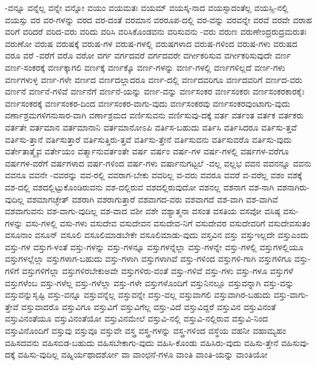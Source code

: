 {-ವನ್ನೂ
ವನ್ನೆಲ್ಲ
ವನ್ನೇ
ವನ್ನೋ
ವಯಂ
ವಯಮತಃ
ವಯಮ್
ವಯಸ್ಕ-ನಾದ
ವಯಸ್ಸಾದಂತೆಲ್ಲ
ವಯಸ್ಸಿ-ನಲ್ಲಿ
ವಯಸ್ಸು
ವರ
ವರ-ಗಳನ್ನು
ವರದ
ವರ-ದಂತೆ
ವರಮಾನ
ವರರೂಪ-ದಲ್ಲಿ
ವರ-ವನ್ನು
ವರವನ್ನೇ
ವರವೆ
ವರವೇ
ವರಾಹ
ವರಿಗೆ
ವರಿದರೆ
ವರಿದ-ವರು
ವರಿದು
ವರಿಸಿ
ವರಿಸಿಕೊಂಡವನು
ವರಿಸುವನು
-ವರು
ವರುಣ
ವರುಣೇಂದ್ರರುದ್ರಮರುತಃ
ವರುಣೋ
ವರುಷ
ವರುಷಕ್ಕೆ
ವರುಷ-ಗಳ
ವರುಷ-ಗಳಲ್ಲಿ
ವರುಷಗಳಾದ
ವರುಷ-ಗಳಿಂದ
ವರುಷ-ಗಳು
ವರುಷದ
ವರೂ
ವರೆ
-ವರೆಗೆ
ವರೊ
ವರೋ
ವರ್ಗ
ವರ್ಗದವರೆ
ವರ್ಗದವರೇ
ವರ್ಗೀಕರಿಸುವ
ವರ್ಗೀಕರಿಸುವುದೇ
ವರ್ಣ
ವರ್ಣ-ಸಂಕರಕ್ಕೆ
ವರ್ಣಕ್ಕಾಗಲಿ
ವರ್ಣಕ್ಕೆ
ವರ್ಣಕ್ಕೊ
ವರ್ಣ-ಗಳನ್ನು
ವರ್ಣ-ಗಳಲ್ಲಿ
ವರ್ಣಗಳಿಲ್ಲದೆ
ವರ್ಣ-ಗಳು
ವರ್ಣಗಳುಳ್ಳ
ವರ್ಣ-ಗಳೇ
ವರ್ಣದ
ವರ್ಣದಲ್ಲಾದರೂ
ವರ್ಣ-ದಲ್ಲಿ
ವರ್ಣದವರಿಗೂ
ವರ್ಣದವರಿಗೆ
ವರ್ಣದ-ವರು
ವರ್ಣನೆ
ವರ್ಣನೆ-ಗಳಿವೆ
ವರ್ಣನೆಗೆ
ವರ್ಣನೆ-ಯನ್ನು
ವರ್ಣ-ವನ್ನು
ವರ್ಣಸಂಕರ
ವರ್ಣಸಂಕರಃ
ವರ್ಣಸಂಕರಕಾರಕೈಃ
ವರ್ಣಸಂಕರಕ್ಕೆ
ವರ್ಣಸಂಕರ-ದಿಂದ
ವರ್ಣಸಂಕರ-ವಾಗು-ವುದು
ವರ್ಣಸಂಕರವು
ವರ್ಣಸಂಕರವುಂಟಾಗು-ವುದು
ವರ್ಣಾಶ್ರಮಗಳಿಗನುಸಾರ-ವಾಗಿ
ವರ್ಣಾಶ್ರಮದ
ವರ್ಣಿಸುವನು
ವರ್ಣಿಸುವು-ದಕ್ಕೆ
ವರ್ತ
ವರ್ತಂತ
ವರ್ತಕ
ವರ್ತಕರು
ವರ್ತತೇ
ವರ್ತಮಾನ
ವರ್ತಮಾನಾನಿ
ವರ್ತಮಾನೋಽಪಿ
ವರ್ತಿಸ-ಬಹುದು
ವರ್ತಿಸಿ
ವರ್ತಿಸಿದರೂ
ವರ್ತಿಸು-ತ್ತವೆ
ವರ್ತಿಸು-ತ್ತಾನೆ
ವರ್ತಿಸುತ್ತಾರೆ
ವರ್ತಿಸುತ್ತಿರು-ತ್ತವೆ
ವರ್ತಿಸು-ತ್ತೇನೆ
ವರ್ತಿಸುವನು
ವರ್ತಿಸುವರೊ
ವರ್ತಿಸು-ವುದು
ವರ್ತೇತಾತ್ಮೈವ
ವರ್ತೇಯಂ
ವರ್ತ್ಮಾನುವರ್ತಂತೇ
ವರ್ಷ
ವರ್ಷಂ
ವರ್ಷ-ಗಳ
ವರ್ಷ-ಗಳಲ್ಲಿ
ವರ್ಷಗಳ-ವರೆಗೂ
ವರ್ಷಗಳ-ವರೆಗೆ
ವರ್ಷಗಳಾದ
ವರ್ಷ-ಗಳಿಂದ
ವರ್ಷ-ಗಳು
ವರ್ಷಾನುಗಟ್ಟಲೆ
-ವಲ್ಲ
ವಲ್ಲಭ
ವವನ
ವವನನ್ನೂ
ವವನು
ವವನೂ
ವವನೇ
-ವವರನ್ನು
ವವ-ರಲ್ಲಿ
ವವರಾಗ-ಬೇಕು
ವವರಿಲ್ಲ
ವ-ವರು
ವವರೂ
ವವರೆ
ವ-ವರೆಲ್ಲ
ವಶಂ
ವಶಕ್ಕೆ
ವಶ-ದಲ್ಲಿ
ವಶದಲ್ಲಿಟ್ಟುಕೊಂಡಿರುವನು
ವಶ-ದಲ್ಲಿರುವ
ವಶದಲ್ಲಿರುವುದೋ
ವಶನಲ್ಲ
ವಶನಾಗ
ವಶ-ನಾಗಿ
ವಶನಾಗಿರು-ವುದಿಲ್ಲ
ವಶಮಾಗಚ್ಛೇತ್
ವಶರಾಗಿ
ವಶರಾಗುತ್ತಾರೆ
ವಶವಾಗದ-ವರು
ವಶವಾಗದೆ
ವಶ-ವಾಗಿ
ವಶ-ವಾಗಿವೆ
ವಶವಾಗುವನು
ವಶ-ವಾಗು-ವುದಿಲ್ಲ
ವಶ-ವಾದ
ವಶೀ
ವಶೇ
ವಶ್ಯಾತ್ಮನಾ
ವಸಂತ
ವಸತಿಯ
ವಸವೋ
ವಸಿಷ್ಠ
ವಸು-ಗಳನ್ನು
ವಸು-ಗಳಲ್ಲಿ
ವಸು-ಗಳು
ವಸುದೇವ
ವಸುದೇವನ
ವಸುದೇವ-ನಿಗೆ
ವಸುದೇವರ
ವಸುದೇವರಿಗೆ
ವಸುದೇವಸುತಂ
ವಸೂನಾಂ
ವಸೂನ್
ವಸೂಲಿ
ವಸೂಲಿಮಾಡಬೇಕೇ
ವಸೂಲಿಮಾಡು-ವುದು
ವಸ್ತವಿನ
ವಸ್ತು
ವಸ್ತುಇಲ್ಲದೇ
ವಸ್ತುಎಂದು
ವಸ್ತು-ಗಳ
ವಸ್ತುಗ-ಳಂತೆ
ವಸ್ತು-ಗಳನ್ನು
ವಸ್ತು-ಗಳನ್ನೂ
ವಸ್ತುಗಳನ್ನೆಲ್ಲಾ
ವಸ್ತು-ಗಳನ್ನೇ
ವಸ್ತು-ಗಳಲ್ಲಿ
ವಸ್ತುಗಳಲ್ಲಿಯೂ
ವಸ್ತುಗಳಲ್ಲೆಲ್ಲಾ
ವಸ್ತುಗಳಾಗ-ಬಹುದು
ವಸ್ತು-ಗಳಾಗಿ
ವಸ್ತುಗಳಾಗಿವೆ
ವಸ್ತು-ಗಳಿಂದ
ವಸ್ತುಗಳಿ-ಗಾಗಿ
ವಸ್ತುಗಳಿಗೂ
ವಸ್ತು-ಗಳಿಗೆ
ವಸ್ತುಗಳಿಗೆಲ್ಲಾ
ವಸ್ತುಗಳಿರಬೇಕುಅವೇ
ವಸ್ತುಗಳಿರು-ವಂತೆ
ವಸ್ತು-ಗಳಿವೆ
ವಸ್ತು-ಗಳು
ವಸ್ತು-ಗಳೂ
ವಸ್ತುಗಳೆ
ವಸ್ತುಗಳೆಂಬ
ವಸ್ತು-ಗಳೆಲ್ಲ
ವಸ್ತು-ಗಳೆಲ್ಲಾ
ವಸ್ತು-ಗಳೇ
ವಸ್ತುಗಳೊಂದಿಗೆ
ವಸ್ತುನಿನಲ್ಲೂ
ವಸ್ತುವನ್ನಾಗಿ
ವಸ್ತು-ವನ್ನು
ವಸ್ತುವನ್ನುಸೃಷ್ಟಿ
ವಸ್ತು-ವನ್ನೂ
ವಸ್ತುವನ್ನೆಲ್ಲ
ವಸ್ತುವನ್ನೇ
ವಸ್ತು-ವಲ್ಲ
ವಸ್ತುವಾಗಲಿ
ವಸ್ತುವಾಗಿರ-ಬಹುದು
ವಸ್ತು-ವಾಗು-ತ್ತೇವೆ
ವಸ್ತುವಾದರೊ
ವಸ್ತುವಿಗೂ
ವಸ್ತುವಿಗೆ
ವಸ್ತುವಿಗೆಲ್ಲ
ವಸ್ತು-ವಿದೆ
ವಸ್ತುವಿದ್ದರೆ
ವಸ್ತುವಿನ
ವಸ್ತುವಿನಂತೆ
ವಸ್ತುವಿನಂತೆಯೂ
ವಸ್ತುವಿನಂತೆಯೋ
ವಸ್ತುವಿನಮೇಲೆ
ವಸ್ತುವಿ-ನಲ್ಲಿ
ವಸ್ತುವಿ-ನಲ್ಲಿರುವ
ವಸ್ತುವಿ-ನಿಂದ
ವಸ್ತುವಿನೊಂದಿಗೆ
ವಸ್ತುವು
ವಸ್ತುವೂ
ವಸ್ತುವೇ
ವಸ್ತ್ರ
ವಸ್ತ್ರ-ಗಳನ್ನು
ವಸ್ತ್ರ-ಗಳಿಂದ
ವಸ್ಥೆಯ
ವಹನೀ
ವಹಾಮ್ಯಹಂ
ವಹಿಸದವನು
ವಹಿಸಬಿಡ-ಬಹುದು
ವಹಿಸಬೇಕಾಗು-ವುದು
ವಹಿಸಿ-ಕೊಂಡು
ವಹಿಸಿರು-ವುದು
ವಹಿಸು-ತ್ತೇನೆ
ವಹಿಸುವು-ದಕ್ಕೆ
ವಹಿಸು-ವುದಿಲ್ಲ
ವಹ್ನಿರ್ಯಥಾದರ್ಶೋ
ವಾ
ವಾಂಛನೆ-ಗಳೂ
ವಾಂತಿ
ವಾಂತಿ-ಯನ್ನು
ವಾಂತಿಯೋ
}
